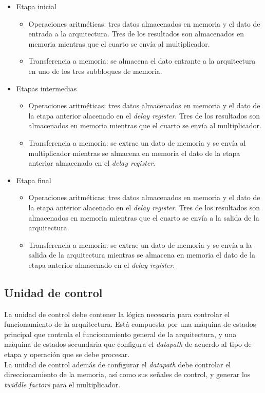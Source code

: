 \begin{itemize}
  \item Etapa inicial
  \begin{itemize}
    \item Operaciones aritméticas: tres datos almacenados en memoria y el dato
    de entrada a la arquitectura. Tres de los resultados son almacenados en memoria mientras que el
    cuarto se envía al multiplicador.
    \item Transferencia a memoria: se almacena el dato entrante a la arquitectura en uno de los tres
    subbloques de memoria.
  \end{itemize}
  \item Etapas intermedias
  \begin{itemize}
    \item Operaciones aritméticas: tres datos almacenados en memoria y el dato de la etapa anterior
    alacenado en el \textit{delay register}. Tres de los resultados son almacenados en memoria mientras que el
    cuarto se envía al multiplicador.
    \item Transferencia a memoria: se extrae un dato de memoria y se envía al multiplicador mientras
    se almacena en memoria el dato de la etapa anterior almacenado en el \textit{delay register}.
  \end{itemize}
  \item Etapa final
  \begin{itemize}
    \item Operaciones aritméticas: tres datos almacenados en memoria y el dato de la etapa anterior
    alacenado en el \textit{delay register}. Tres de los resultados son almacenados en memoria mientras que el
    cuarto se envía a la salida de la arquitectura.
    \item Transferencia a memoria: se extrae un dato de memoria y se envía a la salida de la
    arquitectura mientras se almacena en memoria el dato de la etapa anterior almacenado en el
    \textit{delay register}.
  \end{itemize}
\end{itemize}

\subsection{Unidad de control}

La unidad de control debe contener la lógica necesaria para controlar el funcionamiento de la
arquitectura. Está compuesta por una máquina de estados principal que controla el funcionamiento
general de la arquitectura, y una máquina de estados secundaria que configura el \textit{datapath}
de acuerdo al tipo de etapa y operación que se debe procesar.\\
La unidad de control además de configurar el \textit{datapath} debe controlar el direccionamiento de
la memoria, así como sus señales de control, y generar los \textit{twiddle factors} para el
multiplicador.\\

